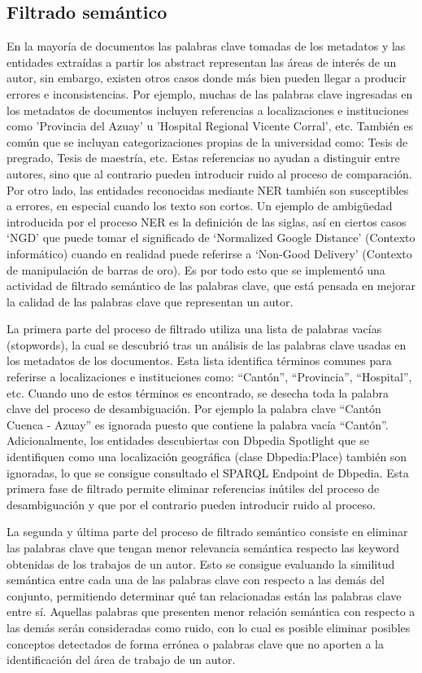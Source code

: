 \documentclass[conference]{IEEEtran}
\begin{document}
\subsection{Filtrado semántico}
En la mayoría de documentos las palabras clave tomadas de los metadatos y las entidades extraídas a partir los abstract representan las áreas de interés de un autor, sin embargo, existen otros casos donde más bien pueden llegar a producir errores e inconsistencias. Por ejemplo, muchas de las palabras clave ingresadas en los metadatos de documentos incluyen referencias a localizaciones  e instituciones como 'Provincia del Azuay' u 'Hospital Regional Vicente Corral', etc. También es común que se incluyan categorizaciones propias de la universidad como: Tesis de pregrado, Tesis de maestría, etc. Estas referencias no ayudan a distinguir entre autores, sino que al contrario pueden introducir ruido al proceso de comparación. Por otro lado, las entidades reconocidas mediante NER también son susceptibles a errores, en especial cuando los texto son cortos. Un ejemplo de ambigüedad introducida por el proceso NER es la definición de las siglas, así en ciertos casos ‘NGD’ que puede tomar el significado de ‘Normalized Google Distance’ (Contexto informático) cuando en realidad puede referirse a ‘Non-Good Delivery’ (Contexto  de manipulación de barras de oro). Es por todo esto que se implementó una actividad de filtrado semántico de las palabras clave, que está pensada en mejorar la calidad de las palabras clave que representan un autor.

La primera parte del proceso de filtrado utiliza una lista de palabras vacías (stopwords), la cual se descubrió tras un análisis de las palabras clave usadas en los metadatos de los documentos. Esta lista identifica términos comunes para referirse a localizaciones e instituciones como: “Cantón”, “Provincia”, “Hospital”, etc. Cuando uno de estos términos es encontrado, se desecha toda la palabra clave del proceso de desambiguación. Por ejemplo la palabra clave “Cantón Cuenca - Azuay” es ignorada puesto que contiene la palabra vacía “Cantón”. Adicionalmente, los entidades descubiertas con Dbpedia Spotlight que se identifiquen como una localización geográfica (clase Dbpedia:Place) también son ignoradas, lo que se consigue consultado el SPARQL Endpoint de Dbpedia. Esta primera fase de filtrado permite eliminar referencias inútiles del proceso de desambiguación y que por el contrario pueden introducir ruido al proceso.

La segunda y última parte del proceso de filtrado semántico consiste en eliminar las palabras clave que tengan menor relevancia semántica respecto las keyword obtenidas de los trabajos de un autor. Esto se consigue evaluando la similitud semántica entre cada una de las palabras clave con respecto a las demás del conjunto, permitiendo  determinar qué tan relacionadas están las palabras clave entre sí. Aquellas palabras que presenten menor relación semántica con respecto a las demás serán consideradas como ruido, con lo cual es posible  eliminar posibles conceptos detectados de forma errónea o palabras clave que no aporten a la identificación del área de trabajo de un autor.
\end{document}
